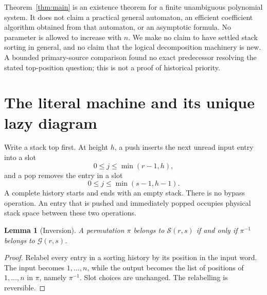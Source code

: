 \documentclass[11pt]{article}
\newtheorem{lemma}[theorem]{Lemma}
\theoremstyle{definition}\newtheorem{definition}[theorem]{Definition}
\theoremstyle{remark}\newtheorem{remark}[theorem]{Remark}
\newcommand{\G}{\mathcal G}
\newcommand{\Sclass}{\mathcal S}
\begin{document}
Theorem~\ref{thm:main} is an existence theorem for a finite unambiguous polynomial system. It does not claim a practical general automaton, an efficient coefficient algorithm obtained from that automaton, or an asymptotic formula. No parameter is allowed to increase with $n$. We make no claim to have settled stack sorting in general, and no claim that the logical decomposition machinery is new. A bounded primary-source comparison found no exact predecessor resolving the stated top-position question; this is not a proof of historical priority.

\section{The literal machine and its unique lazy diagram}\label{sec:machine}
Write a stack top first. At height $h$, a push inserts the next unread input entry into a slot
\[
 0\le j\le\min(r-1,h),
\]
and a pop removes the entry in a slot
\[
 0\le j\le\min(s-1,h-1).
\]
A complete history starts and ends with an empty stack. There is no bypass operation. An entry that is pushed and immediately popped occupies physical stack space between these two operations.

\begin{lemma}[Inversion]\label{lem:inversion}
A permutation $\pi$ belongs to $\Sclass(r,s)$ if and only if $\pi^{-1}$ belongs to $\G(r,s)$.
\end{lemma}
\begin{proof}
Relabel every entry in a sorting history by its position in the input word. The input becomes $1,\ldots,n$, while the output becomes the list of positions of $1,\ldots,n$ in $\pi$, namely $\pi^{-1}$. Slot choices are unchanged. The relabelling is reversible.
\end{proof}
\end{document}
